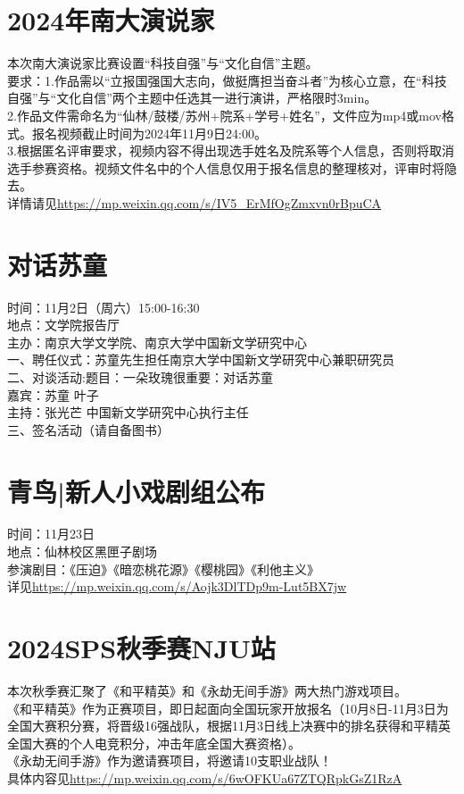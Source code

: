 \documentclass[letterpaper, 12pt]{article}
\begin{document}
\begin{multicols}{2}
\section{2024年南大演说家}
本次南大演说家比赛设置“科技自强”与“文化自信”主题。\\
要求：1.作品需以“立报国强国大志向，做挺膺担当奋斗者”为核心立意，在“科技自强”与“文化自信”两个主题中任选其一进行演讲，严格限时3min。\\
2.作品文件需命名为“仙林/鼓楼/苏州+院系+学号+姓名”，文件应为mp4或mov格式。报名视频截止时间为2024年11月9日24:00。\\
3.根据匿名评审要求，视频内容不得出现选手姓名及院系等个人信息，否则将取消选手参赛资格。视频文件名中的个人信息仅用于报名信息的整理核对，评审时将隐去。\\
详情请见\url{https://mp.weixin.qq.com/s/IV5_ErMfOgZmxvn0rBpuCA}
\section{对话苏童}
时间：11月2日（周六）15:00-16:30\\
地点：文学院报告厅\\
主办：南京大学文学院、南京大学中国新文学研究中心\\
一、聘任仪式：苏童先生担任南京大学中国新文学研究中心兼职研究员\\
二、对谈活动:题目：一朵玫瑰很重要：对话苏童\\
嘉宾：苏童 叶子\\
主持：张光芒 中国新文学研究中心执行主任\\
三、签名活动（请自备图书）

\section{青鸟|新人小戏剧组公布}
时间：11月23日\\
地点：仙林校区黑匣子剧场\\
参演剧目：《压迫》《暗恋桃花源》《樱桃园》《利他主义》\\
详见\url{https://mp.weixin.qq.com/s/Aojk3DlTDp9m-Lut5BX7jw}

\section{2024SPS秋季赛NJU站}
本次秋季赛汇聚了《和平精英》和《永劫无间手游》两大热门游戏项目。\\
《和平精英》作为正赛项目，即日起面向全国玩家开放报名（10月8日-11月3日为全国大赛积分赛，将晋级16强战队，根据11月3日线上决赛中的排名获得和平精英全国大赛的个人电竞积分，冲击年底全国大赛资格）。\\
《永劫无间手游》作为邀请赛项目，将邀请10支职业战队！\\
具体内容见\url{https://mp.weixin.qq.com/s/6wOFKUa67ZTQRpkGsZ1RzA}


\end{multicols}
\end{document}
